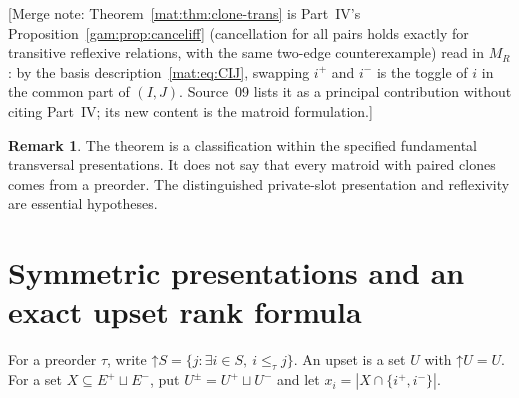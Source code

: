 \documentclass[11pt]{article}
\numberwithin{equation}{section}
\theoremstyle{definition}
\newtheorem{remark}[theorem]{Remark}
\begin{document}
[Merge note: Theorem~\ref{mat:thm:clone-trans} is Part~IV's Proposition~\ref{gam:prop:canceliff} (cancellation for all pairs holds exactly for transitive reflexive relations, with the same two-edge counterexample) read in $M_R$: by the basis description~\eqref{mat:eq:CIJ}, swapping $i^+$ and $i^-$ is the toggle of $i$ in the common part of $(I,J)$. Source~09 lists it as a principal contribution without citing Part~IV; its new content is the matroid formulation.]
\begin{remark}
The theorem is a classification within the specified fundamental
transversal presentations. It does not say that every matroid with paired
clones comes from a preorder. The distinguished private-slot presentation
and reflexivity are essential hypotheses.
\end{remark}

\section{Symmetric presentations and an exact upset rank formula}
\label{mat:sec:rank}
For a preorder $\tau$, write
$\mathord\uparrow S=\{j:\exists i\in S,\ i\leq_\tau j\}$.
An upset is a set $U$ with $\mathord\uparrow U=U$. For a set
$X\subseteq E^+\sqcup E^-$, put $U^\pm=U^+\sqcup U^-$ and let
$x_i=|X\cap\{i^+,i^-\}|$.
\end{document}
